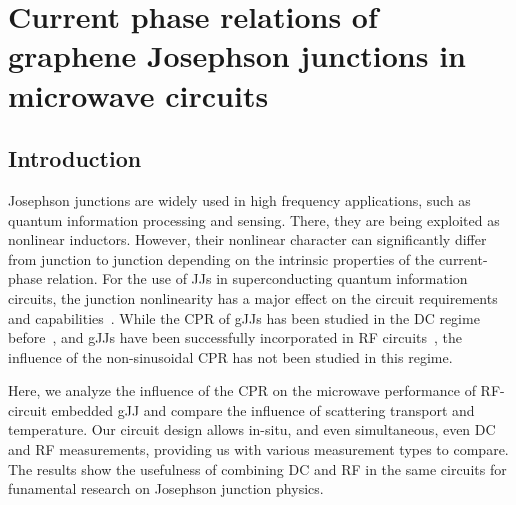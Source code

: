\newchapstyle
\chapter{Current phase relations of graphene Josephson junctions in microwave circuits}
\label{chap:gJJ-CPR}


\begin{abstract}
	We perform extensive analysis of graphene Josephson junctions embedded in microwave circuits.
	By comparing a diffusive junction at \SI{15}{\milli\kelvin} with a ballistic one at \SI{15}{\milli\kelvin} and \SI{1}{\kelvin}, we are able to reconstruct the current-phase relation.
\end{abstract}

\newpage

\section{Introduction}

Josephson junctions are widely used in high frequency applications, such as quantum information processing and sensing.
%
There, they are being exploited as nonlinear inductors.
%
However, their nonlinear character can significantly differ from junction to junction depending on the intrinsic properties of the current-phase relation.
%
For the use of JJs in superconducting quantum information circuits, the junction nonlinearity has a major effect on the circuit requirements and capabilities~\cite{kringhojAnharmonicitySuperconductingQubit2018}.
%
While the CPR of gJJs has been studied in the DC regime before~\cite{englishObservationNonsinusoidalCurrentphase2016,nandaCurrentPhaseRelationBallistic2017}, and gJJs have been successfully incorporated in RF circuits~\cite{schmidtBallisticGrapheneSuperconducting2018,krollMagneticFieldCompatible2018,wangCoherentControlHybrid2019}, the influence of the non-sinusoidal CPR has not been studied in this regime.

Here, we analyze the influence of the CPR on the microwave performance of RF-circuit embedded gJJ and compare the influence of scattering transport and temperature.
%
Our circuit design allows in-situ, and even simultaneous, even DC and RF measurements, providing us with various measurement types to compare.
%
The results show the usefulness of combining DC and RF in the same circuits for funamental research on Josephson junction physics.


